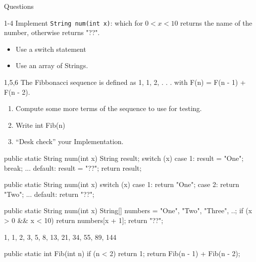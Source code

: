 \documentclass[week2]{csse2002}
\begin{document}
\begin{topic}{Questions}
\begin{subtopic}{1-4}
Implement \texttt{String num(int x)}: which for $0 < x < 10$ returns the name of the number, otherwise returns "??".
\begin{itemize}
    \item Use a switch statement
    \item Use an array of Strings.
\end{itemize}
\end{subtopic}

\begin{subtopic}{1,5,6}
The Fibbonacci sequence is defined as 1, 1, 2, . . . with F(n) = F(n - 1) + F(n - 2).
\begin{enumerate}
    \item Compute some more terms of the sequence to use for testing.
    \item Write int Fib(n)
    \item “Desk check” your Implementation.
\end{enumerate}
\end{subtopic}

\begin{subtopic}{2}
\begin{java}
public static String num(int x) {
    String result;
    switch (x) {
        case 1:
            result = "One";
            break;
        ...
        default:
            result = "??";
    }
    return result;
}
\end{java}
\end{subtopic}

\begin{subtopic}{3}
\begin{java}
public static String num(int x) {
    switch (x) {
        case 1:
            return "One";
        case 2:
            return "Two";
        ...
        default:
            return "??";
    }
}
\end{java}
\end{subtopic}

\begin{subtopic}{4}
\begin{java}
public static String num(int x) {
    String[] numbers = {"One", "Two", "Three", ..};
    if (x > 0 && x < 10) {
        return numbers[x + 1];
    }
    return "??";
}
\end{java}
\end{subtopic}

\begin{subtopic}{5}
1, 1, 2, 3, 5, 8, 13, 21, 34, 55, 89, 144
\end{subtopic}

\begin{subtopic}{6}
\begin{java}
public static int Fib(int n) {
    if (n < 2) {
        return 1;
    }
    return Fib(n - 1) + Fib(n - 2);
}
\end{java}
\end{subtopic}

\end{topic}
\end{document}
